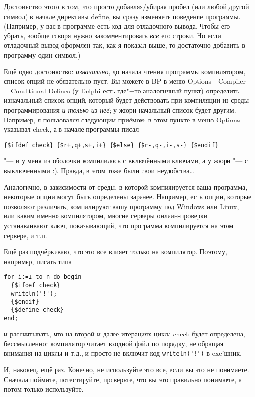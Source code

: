 Достоинство этого в том, что просто добавляя/убирая пробел (или любой другой символ) в начале 
директивы define, вы сразу изменяете поведение программы. (Например, у вас в программе есть код для 
отладочного вывода. Чтобы его убрать, вообще говоря нужно закомментировать \textit{все} его строки. 
Но если отладочный вывод оформлен так, как я показал выше, то достаточно добавить в программу один 
символ.)

Ещё одно достоинство: \textit{изначально}, до начала чтения программы компилятором, список опций не 
обязательно пуст. Вы можете в BP в меню Options---Compiler---Conditional Defines (у Delphi есть 
где"=то аналогичный пункт) определить 
изначальный список опций, который будет действовать при компиляции из среды программирования 
\textit{и только из неё}; у жюри начальный список будет другим. Например, я пользовался следующим 
приёмом: в этом пункте в меню Options указывал check, а в начале программы писал

\begin{center}
\verb|{$ifdef check} {$r+,q+,s+,i+} {$else} {$r-,q-,i-,s-} {$endif}|
\end{center}
"--- и у меня из оболочки компилилось с включёнными ключами, а у жюри "--- с выключенными :). 
Правда, в этом тоже были свои неудобства\dots

Аналогично, в зависимости от среды, в которой компилируется ваша программа, некоторые опции могут 
быть определены заранее. Например, есть опции, которые позволяют различать, компилируют вашу 
программу под Windows или Linux, или каким именно компилятором, многие серверы онлайн-проверки 
устанавливают ключ, показывающий, что программа компилируется на этом сервере, и т.п.

Ещё раз подчёркиваю, что это все влияет только на компилятор. Поэтому, например, писать типа

\begin{center}
\begin{verbatim}
for i:=1 to n do begin
  {$ifdef check}
  writeln('!');
  {$endif}
  {$define check}
end;
\end{verbatim}
\end{center}

и рассчитывать, что на второй и далее итерациях цикла check будет определена, бессмысленно: 
компилятор читает входной файл по порядку, не обращая внимания на циклы и т.д., и просто не включит 
код \verb|writeln('!')| в exe'шник.

И, наконец, ещё раз. Конечно, не используйте это все, если вы это не понимаете. Сначала поймите, 
потестируйте, проверьте, что вы это правильно понимаете, а потом только используйте.

